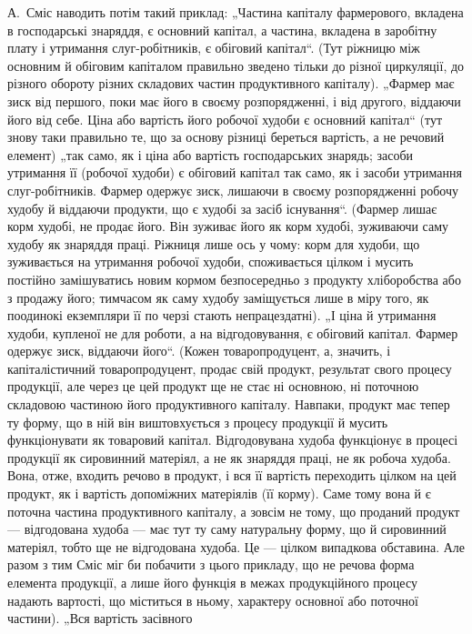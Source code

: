 А.~Сміс наводить потім такий приклад: „Частина капіталу фармерового,
вкладена в господарські знаряддя, є основний капітал, а частина,
вкладена в заробітну плату і утримання слуг-робітників, є обіговий капітал“.
(Тут ріжницю між основним й обіговим капіталом правильно зведено
тільки до різної циркуляції, до різного обороту різних складових
частин продуктивного капіталу). „Фармер має зиск від першого, поки має
його в своєму розпорядженні, і від другого, віддаючи його від себе.
Ціна або вартість його робочої худоби є основний капітал“ (тут знову таки
правильно те, що за основу різниці береться вартість, а не речовий
елемент) „так само, як і ціна або вартість господарських знарядь; засоби
утримання її (робочої худоби) є обіговий капітал так само, як і засоби
утримання слуг-робітників. Фармер одержує зиск, лишаючи в своєму
розпорядженні робочу худобу й віддаючи продукти, що є худобі за засіб
існування“. (Фармер лишає корм худобі, не продає його. Він зуживає
його як корм худобі, зуживаючи саму худобу як знаряддя праці.
Ріжниця лише ось у чому: корм для худоби, що зуживається на утримання
робочої худоби, споживається цілком і мусить постійно замішуватись
новим кормом безпосередньо з продукту хліборобства або з продажу
його; тимчасом як саму худобу заміщується лише в міру того, як
поодинокі екземпляри її по черзі стають непрацездатні). „І ціна й утримання
худоби, купленої не для роботи, а на відгодовування, є обіговий капітал.
Фармер одержує зиск, віддаючи його“. (Кожен товаропродуцент,
а, значить, і капіталістичний товаропродуцент, продає свій продукт,
результат свого процесу продукції, але через це цей продукт
ще не стає ні основною, ні поточною складовою частиною його
продуктивного капіталу. Навпаки, продукт має тепер ту форму, що
в ній він виштовхується з процесу продукції й мусить функціонувати як товаровий
капітал. Відгодовувана худоба функціонує в процесі продукції як
сировинний матеріял, а не як знаряддя праці, не як робоча худоба. Вона,
отже, входить речово в продукт, і вся її вартість переходить цілком
на цей продукт, як і вартість допоміжних матеріялів (її корму). Саме тому
вона й є поточна частина продуктивного капіталу, а зовсім не тому,
що проданий продукт — відгодована худоба — має тут ту саму натуральну
форму, що й сировинний матеріял, тобто ще не відгодована худоба. Це —
цілком випадкова обставина. Але разом з тим Сміс міг би побачити з
цього прикладу, що не речова форма елемента продукції, а лише його
функція в межах продукційного процесу надають вартості, що міститься
в ньому, характеру основної або поточної частини). „Вся вартість засівного
